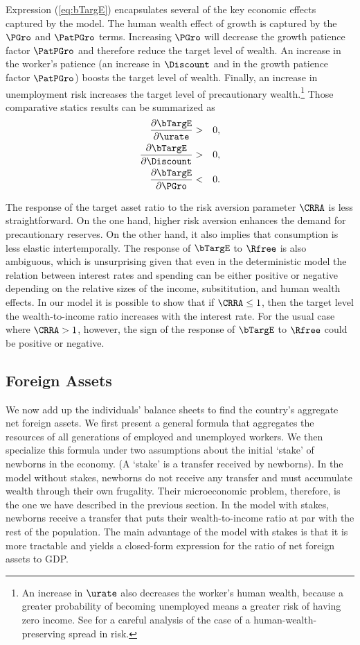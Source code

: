 \documentclass[titlepage]{\econtex}\newcommand{\texname}{cjSOE}
\begin{document}
Expression (\ref{eq:bTargE}) encapsulates several of the key economic
effects captured by the model.  The human wealth effect of growth is
captured by the $\PGro$ and $\PatPGro$ terms. Increasing $\PGro$ will
decrease the growth patience factor $\PatPGro$ and therefore reduce the
target level of wealth.  An increase in the worker's
patience (an increase in $\Discount$ and in the growth patience factor
$\PatPGro$) boosts the target level of wealth.  Finally, an increase in
unemployment risk increases the target level of precautionary wealth.\footnote{An increase in $\urate$ also decreases the worker's human wealth, because a greater probability of becoming unemployed means a greater risk of having zero income.  See \cite{ctDiscrete} for a careful analysis of the case of a human-wealth-preserving spread in risk.}
Those comparative statics results can be summarized as
\begin{eqnarray}
\frac{\partial \bTargE}{\partial \urate}   & > & 0, \label{eq:compstat}
\\ \frac{\partial \bTargE}{\partial \Discount} & >& 0, \nonumber
\\ \frac{\partial \bTargE}{\partial \PGro} & <& 0. \nonumber
\end{eqnarray}

The response of the target asset ratio to the risk aversion parameter
$\CRRA$ is less straightforward. On the one hand, higher risk aversion
enhances the demand for precautionary reserves. On the other hand, it
also implies that consumption is less elastic intertemporally.  The
response of $\bTargE$ to $\Rfree$ is also ambiguous, which is
unsurprising given that even in the deterministic model the relation
between interest rates and spending can be either positive or negative
depending on the relative sizes of the income, subsititution, and
human wealth effects.  In our model it is possible to show that if
$\CRRA \leq 1$, then the target level the wealth-to-income ratio
increases with the interest rate. For the usual case where $\CRRA >1$,
however, the sign of the response of $\bTargE$ to $\Rfree$ could be
positive or negative.


\subsection{Foreign Assets}

We now add up the individuals' balance sheets to find the country's
aggregate net foreign assets. We first present a general formula that
aggregates the resources of all generations of employed and unemployed
workers. We then specialize this formula under two assumptions about
the initial `stake' of newborns in the economy.  (A `stake' is a
transfer received by newborns). In the model without stakes, newborns
do not receive any transfer and must accumulate wealth through their
own frugality. Their microeconomic problem, therefore, is the one we
have described in the previous section. In the model with stakes,
newborns receive a transfer that puts their wealth-to-income ratio at
par with the rest of the population. The main advantage of the model
with stakes is that it is more tractable and yields a closed-form
expression for the ratio of net foreign assets to GDP.
\end{document}
